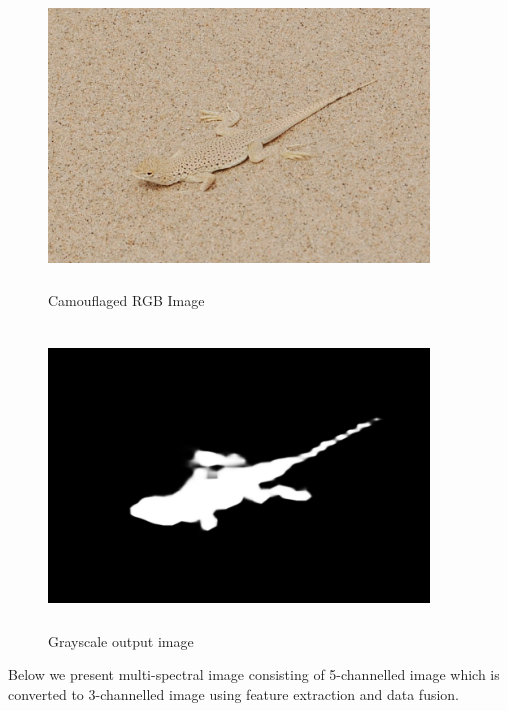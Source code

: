 \begin{figure}[h]
  \centering
  \includegraphics[width=0.9\textwidth,height=8cm]{sections/LBP/camourflage_00018.jpg}
  \caption{Camouflaged RGB Image}
  \label{fig:figure_label}
\end{figure}
\vspace{2cm}
\begin{figure}[h]
  \centering
  \includegraphics[width=0.9\textwidth,height=8cm]{sections/LBP/camourflage_00018.png}
  \caption{Grayscale output image}
  \label{fig:figure_label}
\end{figure}
\vspace{0.5cm}

\newpage
Below we present multi-spectral image consisting of 5-channelled image which is converted to 3-channelled image using feature extraction and data fusion.

